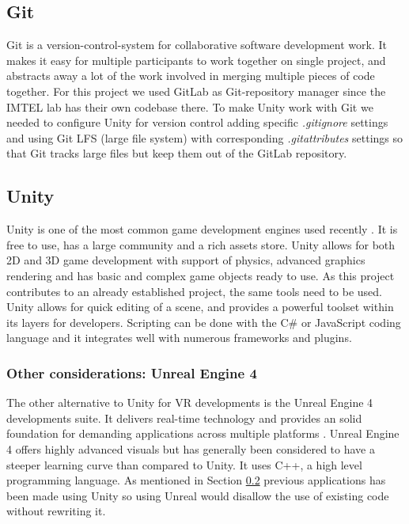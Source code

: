 \subsection{Git}
Git is a version-control-system for collaborative software development work. It makes it easy for multiple participants to work together on single project, and abstracts away a lot of the work involved in merging multiple pieces of code together. For this project we used GitLab \cite{GitLab} as Git-repository manager since the IMTEL lab has their own codebase there. To make Unity work with Git we needed to configure Unity for version control adding specific \textit{.gitignore} settings and using Git LFS (large file system) with corresponding \textit{.gitattributes} settings so that Git tracks large files but keep them out of the GitLab repository. 

\subsection{Unity}
\label{section: untiy}
Unity is one of the most common game development engines used recently \cite{unity}. It is free to use, has a large community and a rich assets store. Unity allows for both 2D and 3D game development with support of physics, advanced graphics rendering and has basic and complex game objects ready to use. As this project contributes to an already established project, the same tools need to be used. Unity allows for quick editing of a scene, and provides a powerful toolset within its layers for developers. Scripting can be done with the C\# or JavaScript coding language and it integrates well with numerous frameworks and plugins.

\subsubsection{Other considerations: Unreal Engine 4}
The other alternative to Unity for VR developments is the Unreal Engine 4 developments suite. It delivers real-time technology and provides an solid foundation for demanding applications across multiple platforms \cite{unrealEngine}. Unreal Engine 4 offers highly advanced visuals but has generally been considered to have a steeper learning curve than compared to Unity. It uses C++, a high level programming language. As mentioned in Section \ref{section: untiy} previous applications has been made using Unity so using Unreal would disallow the use of existing code without rewriting it.       


